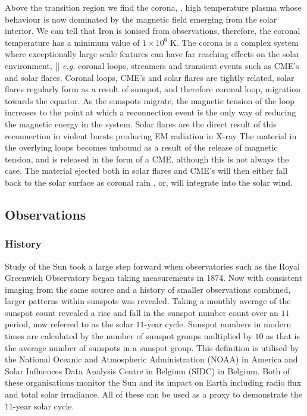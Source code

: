Above the transition region we find the corona, \cite{Golub2009}, high temperature plasma whose behaviour is now dominated by the magnetic field emerging from the solar interior.
We can tell that Iron is ionised from observations, therefore, the coronal temperature has a minimum value of $1 \times 10^6$ K.
The corona is a complex system where exceptionally large scale features can have far reaching effects on the solar environment, [\cite{Reale2014}] \emph{e.g.} coronal loops, streamers and transient events such as CME's and solar flares.
Coronal loops, CME's and solar flares are tightly related, solar flares regularly form as a result of sunspot, and therefore coronal loop, migration towards the equator.
As the sunspots migrate, the magnetic tension of the loop increases to the point at which a reconnection event is the only way of reducing the magnetic energy in the system.
Solar flares are the direct result of this reconnection in violent bursts producing EM radiation in X-ray
The material in the overlying loops becomes unbound as a result of the release of magnetic tension, and is released in the form of a CME, although this is not always the case.
The material ejected both in solar flares and CME's will then either fall back to the solar surface as coronal rain , or, will integrate into the solar wind.


\subsection{Observations}

\subsubsection{History}

Study of the Sun took a large step forward when observatories such as the Royal Greenwich Observatory began taking measurements in 1874.
Now with consistent imaging from the same source and a history of smaller observations combined, larger patterns within sunspots was revealed.
Taking a monthly average of the sunspot count revealed a rise and fall in the sunspot number count over an $11$ period, now referred to as the solar $11$-year cycle.
Sunspot numbers in modern times are calculated by the number of sunspot groups multiplied by $10$ as that is the average number of sunspots in a sunspot group.
This definition is utilised by the National Oceanic and Atmospheric Administration (NOAA) in America and Solar Influences Data Analysis Centre in Belgium (SIDC) in Belgium.
Both of these organisations monitor the Sun and its impact on Earth including radio flux and total solar irradiance.
All of these can be used as a proxy to demonstrate the $11$-year solar cycle.

